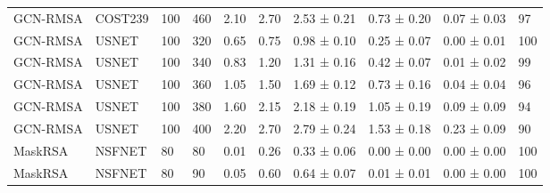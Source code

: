 \begin{longtable}[!htbp]{llll|lllll|l}
GCN-RMSA             & COST239           & 100                  & 460                                                               & 2.10  & \multicolumn{1}{l|}{2.70}     & 2.53 ± 0.21 & 0.73 ± 0.20      & 0.07 ± 0.03                  & 97                                                                                    \\
GCN-RMSA             & USNET             & 100                  & 320                                                               & 0.65 & \multicolumn{1}{l|}{0.75}    & 0.98 ± 0.10 & 0.25 ± 0.07      & 0.00 ± 0.01                  & 100                                                                                    \\
GCN-RMSA             & USNET             & 100                  & 340                                                               & 0.83 & \multicolumn{1}{l|}{1.20}     & 1.31 ± 0.16 & 0.42 ± 0.07      & 0.01 ± 0.02                  & 99                                                                                    \\
GCN-RMSA             & USNET             & 100                  & 360                                                               & 1.05 & \multicolumn{1}{l|}{1.50}     & 1.69 ± 0.12 & 0.73 ± 0.16      & 0.04 ± 0.04                  & 96                                                                                    \\
GCN-RMSA             & USNET             & 100                  & 380                                                               & 1.60  & \multicolumn{1}{l|}{2.15}    & 2.18 ± 0.19 & 1.05 ± 0.19      & 0.09 ± 0.09                  & 94                                                                                    \\
GCN-RMSA             & USNET             & 100                  & 400                                                               & 2.20  & \multicolumn{1}{l|}{2.70}     & 2.79 ± 0.24 & 1.53 ± 0.18      & 0.23 ± 0.09                  & 90                                                                                    \\
MaskRSA              & NSFNET            & 80                   & 80                                                                & 0.01 & \multicolumn{1}{l|}{0.26}    & 0.33 ± 0.06 & 0.00 ± 0.00      & 0.00 ± 0.00                  & 100                                                                                    \\
MaskRSA              & NSFNET            & 80                   & 90                                                                & 0.05 & \multicolumn{1}{l|}{0.60}     & 0.64 ± 0.07 & 0.01 ± 0.01      & 0.00 ± 0.00                  & 100                                                                                    \\

\end{longtable}
